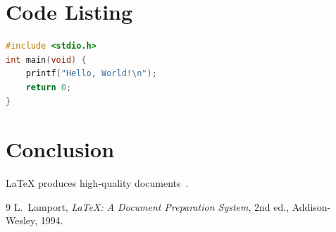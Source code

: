 \documentclass[12pt,a4paper]{article}
\begin{document}
\section{Code Listing}
\begin{lstlisting}[language=C, frame=single]
#include <stdio.h>
int main(void) {
    printf("Hello, World!\n");
    return 0;
}
\end{lstlisting}

\section{Conclusion}
\LaTeX{} produces high-quality documents~\cite{lamport94}.

\begin{thebibliography}{9}
   L.~Lamport, \emph{\LaTeX: A Document Preparation System}, 2nd ed., Addison-Wesley, 1994.
\end{thebibliography}
\end{document}
